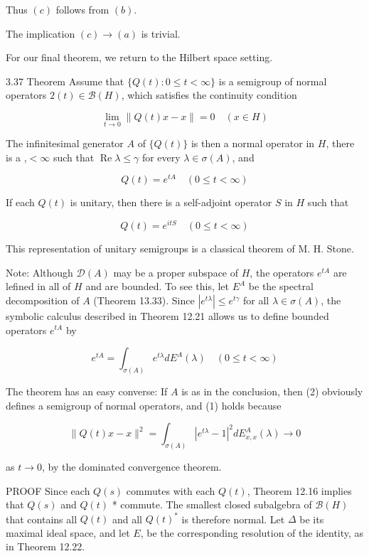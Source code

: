 \documentclass[10pt]{article}
\begin{document}
Thus $(c)$ follows from $(b)$.

The implication $(c) \rightarrow(a)$ is trivial.

For our final theorem, we return to the Hilbert space setting.

3.37 Theorem Assume that $\{Q(t): 0 \leq t<\infty\}$ is a semigroup of normal operators $\mathcal{2}(t) \in \mathscr{B}(H)$, which satisfies the continuity condition

$$
\lim _{t \rightarrow 0}\|Q(t) x-x\|=0 \quad(x \in H)
$$

The infinitesimal generator $A$ of $\{Q(t)\}$ is then a normal operator in $H$, there is a ,$<\infty$ such that $\operatorname{Re} \lambda \leq \gamma$ for every $\lambda \in \sigma(A)$, and

$$
Q(t)=e^{t A} \quad(0 \leq t<\infty)
$$

If each $Q(t)$ is unitary, then there is a self-adjoint operator $S$ in $H$ such that

$$
Q(t)=e^{i t S} \quad(0 \leq t<\infty)
$$

This representation of unitary semigroups is a classical theorem of $\mathrm{M}$. H. Stone.

Note: Although $\mathscr{D}(A)$ may be a proper subspace of $H$, the operators $e^{t A}$ are lefined in all of $H$ and are bounded. To see this, let $E^{A}$ be the spectral decomposition of $A$ (Theorem 13.33). Since $\left|e^{t \lambda}\right| \leq e^{t \gamma}$ for all $\lambda \in \sigma(A)$, the symbolic calculus described in Theorem 12.21 allows us to define bounded operators $e^{t A}$ by

$$
e^{t A}=\int_{\sigma(A)} e^{t \lambda} d E^{A}(\lambda) \quad(0 \leq t<\infty)
$$

The theorem has an easy converse: If $A$ is as in the conclusion, then (2) obviously defines a semigroup of normal operators, and (1) holds because

$$
\|Q(t) x-x\|^{2}=\int_{\sigma(A)}\left|e^{t \lambda}-1\right|^{2} d E_{x, x}^{A}(\lambda) \rightarrow 0
$$

as $t \rightarrow 0$, by the dominated convergence theorem.

PROOF Since each $Q(s)$ commutes with each $Q(t)$, Theorem 12.16 implies that $Q(s)$ and $Q(t)$ * commute. The smallest closed subalgebra of $\mathscr{B}(H)$ that contains all $Q(t)$ and all $Q(t)^{*}$ is therefore normal. Let $\Delta$ be its maximal ideal space, and let $E$, be the corresponding resolution of the identity, as in Theorem 12.22.
\end{document}

